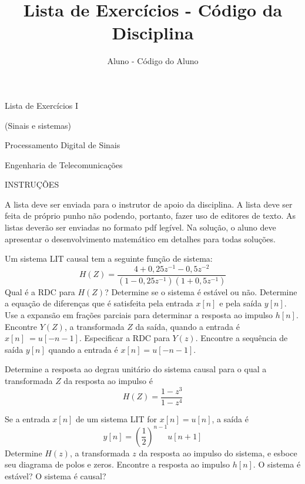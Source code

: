 \documentclass[12pt,a4paper]{article}
\author{Aluno - Código do Aluno}
\title{Lista de Exercícios - Código da Disciplina}
\date{}
\begin{document}
	\begin{center}
    {\large Lista de Exercícios I\par (Sinais e sistemas) \par}
    {\large Processamento Digital de Sinais\par}
    {\large Engenharia de Telecomunicações \par}
	\end{center}

\begin{center}
   INSTRUÇÕES
\end{center} 
\begin{subitemize}
    \thisone A lista deve ser enviada para o instrutor de apoio da disciplina.
    \thisone A lista deve ser feita de próprio punho não podendo, portanto, fazer uso de editores de texto.
    \thisone  As listas deverão ser enviadas  no formato pdf legível.
    \thisone Na solução, o aluno deve apresentar o desenvolvimento matemático em detalhes para todas soluções.
\end{subitemize}
\problem Um sistema LIT causal tem a seguinte função de sistema:
\begin{equation}
    H(Z) = \dfrac{4 + 0,25z^{-1} - 0,5z^{-2}}{\left(1 - 0,25z^{-1} \right)\left(1 + 0,5z^{-1} \right)}
\end{equation}
\subproblem Qual é a RDC para $H(Z)$?
\subproblem Determine se o sistema é estável ou não.
\subproblem Determine a equação de diferenças que é satisfeita
pela entrada $x[n]$ e pela saída $y[n]$.
\subproblem Use a expansão em frações parciais para determinar
a resposta ao impulso $h[n]$.
\subproblem Encontre $Y(Z)$, a transformada $Z$ da saída, quando
a entrada é $x[n]~ = u[-n-1]$. Especificar a RDC
para $Y(z)$.
\subproblem Encontre a sequência de saída $y[n]$ quando a entrada
é $x[n] = u[-n-1]$.

\answer 

\problem Determine a resposta ao degrau unitário do sistema causal
para o qual a transformada $Z$ da resposta ao impulso é
\begin{equation}
    H(Z) = \dfrac{1 - z^3}{1 - z^4}
\end{equation}
	
\answer

\problem Se a entrada $x[n]$ de um sistema LIT for $x[n] = u[n]$, a saída é
\begin{equation}
    y[n] = \left( \dfrac{1}{2} \right)^{n-1}u[n + 1]
\end{equation}
\subproblem Determine $H(z)$, a transformada $z$ da resposta ao impulso
do sistema, e esboce seu diagrama de polos e zeros.
\subproblem Encontre a resposta ao impulso $h[n]$.
\subproblem O sistema é estável?
\subproblem O sistema é causal?
\end{document}
